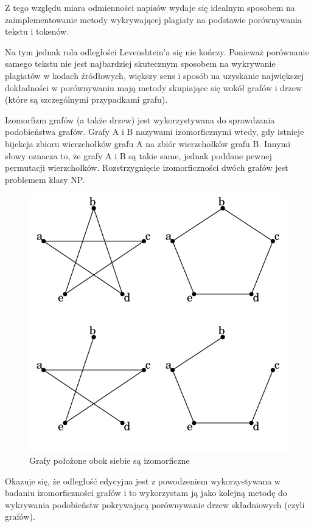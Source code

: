 \documentclass[a4paper,12pt]{article}
\begin{document}
Z tego względu miara odmienności napisów wydaje się idealnym sposobem na zaimplementowanie metody wykrywającej plagiaty na podstawie porównywania tekstu i tokenów.

Na tym jednak rola odległości Levenshtein'a się nie kończy. Ponieważ porównanie samego tekstu nie jest najbardziej skutecznym sposobem na wykrywanie plagiatów w kodach źródłowych, większy sens i sposób na uzyskanie największej dokładności w porównywaniu mają metody skupiające się wokół grafów i drzew (które są szczególnymi przypadkami grafu).

Izomorfizm grafów (a także drzew) jest wykorzystywana do sprawdzania podobieństwa grafów. Grafy A i B nazywami izomorficznymi wtedy, gdy istnieje bijekcja zbioru wierzchołków grafu A na zbiór wierzchołków grafu B. Innymi słowy oznacza to, że grafy A i B są takie same, jednak poddane pewnej permutacji wierzchołków. Rozstrzygnięcie izomorficzności dwóch grafów jest problemem klasy NP.

\begin{figure}[h!]
\centering
\includegraphics[scale=0.5]{gfx/isomorphism.png}
\caption{Grafy położone obok siebie są izomorficzne}
\end{figure}

Okazuje się, że odległość edycyjna jest z powodzeniem wykorzystywana w badaniu izomorficzności grafów i to wykorzystam ją jako kolejną metodę do wykrywania podobieństw pokrywającą porównywanie drzew składniowych (czyli grafów).
\end{document}
